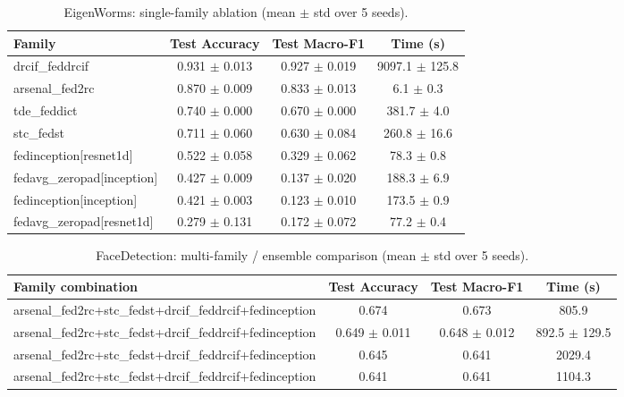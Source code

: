 \begin{table}[t]
\centering
\caption{EigenWorms: single-family ablation (mean $\pm$ std over 5 seeds).}
\label{tab:results_eigenworms_ablation}
\begin{tabular}{lccc}
\toprule
Family & Test Accuracy & Test Macro-F1 & Time (s) \\
\midrule
drcif\_feddrcif & 0.931 $\pm$ 0.013 & 0.927 $\pm$ 0.019 & 9097.1 $\pm$ 125.8 \\
arsenal\_fed2rc & 0.870 $\pm$ 0.009 & 0.833 $\pm$ 0.013 & 6.1 $\pm$ 0.3 \\
tde\_feddict & 0.740 $\pm$ 0.000 & 0.670 $\pm$ 0.000 & 381.7 $\pm$ 4.0 \\
stc\_fedst & 0.711 $\pm$ 0.060 & 0.630 $\pm$ 0.084 & 260.8 $\pm$ 16.6 \\
fedinception[resnet1d] & 0.522 $\pm$ 0.058 & 0.329 $\pm$ 0.062 & 78.3 $\pm$ 0.8 \\
fedavg\_zeropad[inception] & 0.427 $\pm$ 0.009 & 0.137 $\pm$ 0.020 & 188.3 $\pm$ 6.9 \\
fedinception[inception] & 0.421 $\pm$ 0.003 & 0.123 $\pm$ 0.010 & 173.5 $\pm$ 0.9 \\
fedavg\_zeropad[resnet1d] & 0.279 $\pm$ 0.131 & 0.172 $\pm$ 0.072 & 77.2 $\pm$ 0.4 \\
\bottomrule
\end{tabular}
\end{table}

\begin{table}[t]
\centering
\caption{FaceDetection: multi-family / ensemble comparison (mean $\pm$ std over 5 seeds).}
\label{tab:results_facedetection_ensemble}
\begin{tabular}{lccc}
\toprule
Family combination & Test Accuracy & Test Macro-F1 & Time (s) \\
\midrule
arsenal\_fed2rc+stc\_fedst+drcif\_feddrcif+fedinception & 0.674 & 0.673 & 805.9 \\
arsenal\_fed2rc+stc\_fedst+drcif\_feddrcif+fedinception & 0.649 $\pm$ 0.011 & 0.648 $\pm$ 0.012 & 892.5 $\pm$ 129.5 \\
arsenal\_fed2rc+stc\_fedst+drcif\_feddrcif+fedinception & 0.645 & 0.641 & 2029.4 \\
arsenal\_fed2rc+stc\_fedst+drcif\_feddrcif+fedinception & 0.641 & 0.641 & 1104.3 \\
\bottomrule
\end{tabular}
\end{table}

